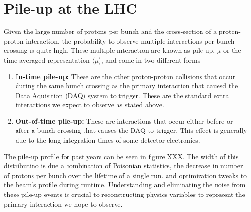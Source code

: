 \section{Pile-up at the LHC} \label{sec:lhc:pileup}

Given the large number of protons per bunch and the cross-section of a
proton-proton interaction, the probability to observe multiple interactions per
bunch crossing is quite high.  These multiple-interaction are known as pile-up,
$\mu$ or the time averaged representation $\langle \mu \rangle$, and come in two
different forms: 

\begin{enumerate} \item \textbf{In-time pile-up:} These are the other
proton-proton collisions that occur during the same bunch crossing as the
primary interaction that cauesd the Data Aquisition (DAQ) system to trigger.
These are the standard extra interactions we expect to observe as stated above.
\item \textbf{Out-of-time pile-up:} These are interactions that occur either
before or after a bunch crossing that causes the DAQ to trigger.  This effect is
generally due to the long integration times of some detector electronics.
\end{enumerate}

The pile-up profile for past years can be seen in figure XXX.  The width of this
distributino is due a combination of Poisonian statistics, the decrease in
number of protons per bunch over the lifetime of a single run, and optimization
tweaks to the beam's profile during runtime.  Understanding and eliminating the
noise from these pile-up events is crucial to reconstructing physics variables
to represent the primary interaction we hope to observe.
